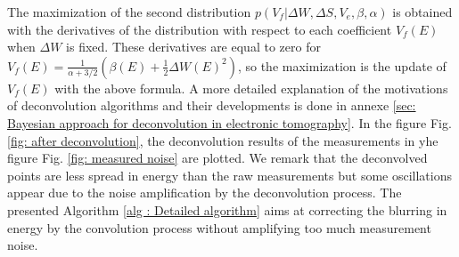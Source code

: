The maximization of the second distribution $p\left(V_{f}\left|\right.\Delta W, \Delta S, V_{e}, \beta, \alpha\right)$ is obtained with the derivatives of the distribution with respect to each coefficient $V_f(E)$ when $\Delta W$ is fixed.
These derivatives are equal to zero for $V_{f}\left(E\right) = \frac{1}{\alpha+3/2}\left(\beta\left(E\right)+\frac{1}{2}\Delta W\left(E\right)^{2}\right)$, so the maximization is the update of $V_f(E)$ with the above formula.
A more detailed explanation of the motivations of deconvolution algorithms and their developments is done in annexe \ref{sec: Bayesian approach for deconvolution in electronic tomography}.
In the figure Fig. \ref{fig: after deconvolution}, the deconvolution results of the measurements in yhe figure Fig. \ref{fig: measured noise} are plotted.
We remark that the deconvolved points are less spread in energy than the raw measurements but some oscillations appear due to the noise amplification by the deconvolution process.
The presented Algorithm \ref{alg : Detailed algorithm} aims at correcting the blurring in energy by the convolution process without amplifying too much measurement noise.

